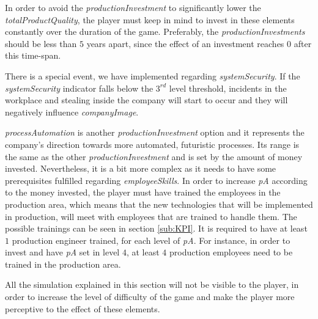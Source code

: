\begin{figure}[ht]
\centering
{}
	\label{fig:InvestmentGraph}
\end{figure}


In order to avoid the \textit{productionInvestment} to significantly lower the \textit{totalProductQuality}, the player must keep in mind to invest in these elements constantly over the duration of the game. Preferably, the \textit{productionInvestments} should be less than $5$ years apart, since the effect of an investment reaches $0$ after this time-span.

There is a special event, we have implemented regarding \textit{systemSecurity}.
If the \textit{systemSecurity} indicator falls below the $3^{rd}$ level threshold, incidents in the workplace and stealing inside the company will start to occur and they will negatively influence \textit{companyImage}. 

\textit{processAutomation} is another \textit{productionInvestment} option and it represents the company's direction towards more automated, futuristic processes. Its range is the same as the other \textit{productionInvestment} and is set by the amount of money invested. Nevertheless, it is a bit more complex as it needs to have some prerequisites fulfilled regarding \textit{employeeSkills}. In order to increase \textit{pA} according to the money invested, the player must have trained the employees in the production area, which means that the new technologies that will be implemented in production, will meet with employees that are trained to handle them. The possible trainings can be seen in section \ref{sub:KPI}. It is required to have at least $1$ production engineer trained, for each level of \textit{pA}. For instance, in order to invest and have \textit{pA} set in level $4$, at least $4$ production employees need to be trained in the production area.

All the simulation explained in this section will not be visible to the player, in order to increase the level of difficulty of the game and make the player more perceptive to the effect of these elements. 


